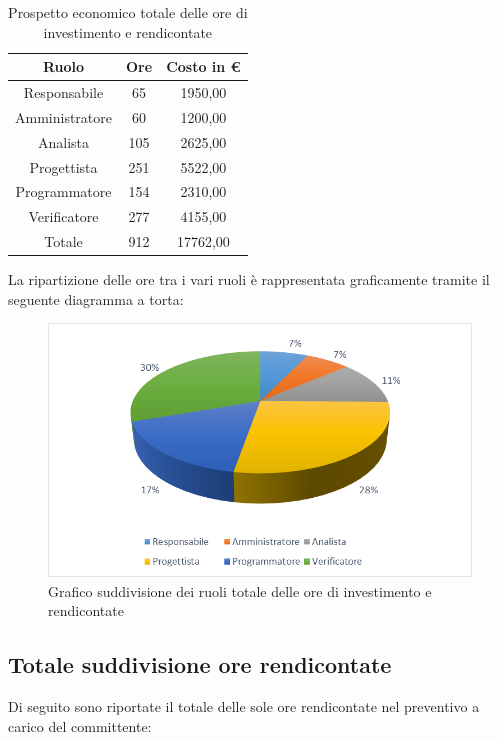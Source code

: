 \documentclass[./PianodiProgetto.tex]{subfiles}
\begin{document}
\begin{table}[H]
	\centering
	\begin{tabular}{|c|c|c|}
		\hline
		Ruolo&Ore&Costo in \euro{} \\ \hline
		Responsabile&65&1950,00  \\ \hline
		Amministratore&60&1200,00  \\ \hline
		Analista&105&2625,00 \\ \hline
		Progettista&251&5522,00 \\ \hline
		Programmatore&154&2310,00 \\ \hline
		Verificatore&277&4155,00  \\ \hline
		Totale&912&17762,00 \\ \hline
	\end{tabular}
	\caption{Prospetto economico totale delle ore di investimento e rendicontate}
\end{table}

La ripartizione delle ore tra i vari ruoli è rappresentata graficamente tramite il seguente diagramma a torta:

\begin{figure}[H]
	\centering
	\includegraphics[width=1\linewidth]{img/grafici/OreInvestimentoRendicontateProspettoEconomico}
	\caption{Grafico suddivisione dei ruoli totale delle ore di investimento e rendicontate}
	\label{fig:ore-investimento-rendicontate-prospetto-economico}
\end{figure}


\subsection{Totale suddivisione ore rendicontate}
Di seguito sono riportate il totale delle sole ore rendicontate nel preventivo a carico del committente:
\end{document}
